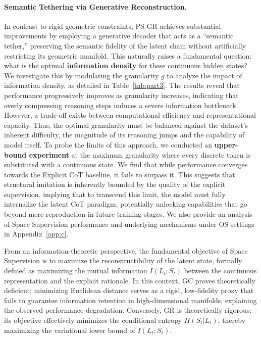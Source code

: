 \paragraph{Semantic Tethering via Generative Reconstruction.}
In contrast to rigid geometric constraints, \textsc{PS-GR} achieves substantial improvements by employing a generative decoder that acts as a ``semantic tether,'' preserving the semantic fidelity of the latent chain without artificially restricting its geometric manifold.
This naturally raises a fundamental question: what is the optimal \textbf{information density} for these continuous hidden states? We investigate this by modulating the granularity $g$ to analyze the impact of information density, as detailed in Table~\ref{tab:part3}. The results reveal that performance progressively improves as granularity increases, indicating that overly compressing reasoning steps induces a severe information bottleneck.
However, a trade-off exists between computational efficiency and representational capacity. Thus, the optimal granularity must be balanced against the dataset's inherent difficulty, the magnitude of its reasoning jumps and the capability of model itself.
To probe the limits of this approach, we conducted an \textbf{upper-bound experiment} at the maximum granularity where every discrete token is substituted with a continuous state. We find that while performance converges towards the Explicit CoT baseline, it fails to surpass it. This suggests that structural imitation is inherently bounded by the quality of the explicit supervision, implying that to transcend this limit, the model must fully internalize the latent CoT paradigm, potentially unlocking capabilities that go beyond mere reproduction in future training stages. 
We also provide an analysis of Space Supervision performance and underlying mechanisms under OS settings in Appendix~\ref{app:c}.

From an information-theoretic perspective, the fundamental objective of Space Supervision is to maximize the reconstructibility of the latent state, formally defined as maximizing the mutual information $I(L_t; S_t)$ between the continuous representation and the explicit rationale. 
In this context, \textsc{GC} proves theoretically deficient; minimizing Euclidean distance serves as a rigid, low-fidelity proxy that fails to guarantee information retention in high-dimensional manifolds, explaining the observed performance degradation. 
Conversely, \textsc{GR} is theoretically rigorous: its objective effectively minimizes the conditional entropy $H(S_t|L_t)$, thereby maximizing the variational lower bound of $I(L_t; S_t)$. 

